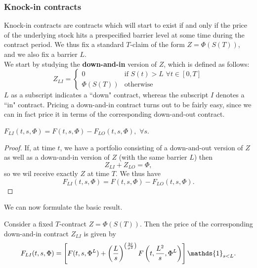 \subsubsection{Knock-in contracts}
Knock-in contracts are contracts which will start to exist if and only if the price of the underlying stock hits a prespecified barrier level at some time during the contract period. We thus fix a standard $T$-claim of the form $Z = \Phi(S(T))$, and we also fix a barrier $L$. \\
We start by studying the \textbf{down-and-in} version of $Z$, which is defined as follows:
\begin{equation}
    Z_{LI} =
    \begin{cases}
        0 & \text{if } S(t)>L\,\,\forall t\in[0,T] \\
        \Phi(S(T)) & \text{otherwise}
    \end{cases}
\end{equation}
$L$ as a subscript indicates a ``down" contract, whereas the subscript $I$ denotes a ``in" contract. Pricing a down-and-in contract turns out to be fairly easy, since we can in fact price it in terms of the corresponding down-and-out contract.
\begin{lemma}
    $F_{LI}(t, s, \Phi) = F(t, s, \Phi) - F_{LO}(t, s, \Phi),\,\, \forall s$.
\end{lemma}
\begin{proof}
    If, at time $t$, we have a portfolio consisting of a down-and-out version of $Z$ as well as a down-and-in version of $Z$ (with the same barrier $L$) then
    \begin{equation*}
        Z_{LI} + Z_{LO} = \Phi,
    \end{equation*}
    so we wil receive exactly $Z$ at time $T$. We thus have
    \begin{equation*}
        F_{LI} (t, s, \Phi) = F(t, s, \Phi) - F_{LO}(t, s, \Phi).
    \end{equation*}
\end{proof}
We can now formulate the basic result.
\begin{proposition}
    Consider a fixed $T$-contract $Z = \Phi(S(T))$. Then the price of the corresponding down-and-in contract $Z_{LI}$ is given by
    \begin{equation}
        F_{LI}(t,s,\Phi) = \left[F(t,s,\Phi^L)+\left(\frac{L}{s}\right)^{\left(\frac{2\Tilde{r}}{\sigma^2}\right)} F\left(t,\frac{L^2}{s},\Phi^L\right)\right]\mathds{1}_{s<L}.
    \end{equation}
\end{proposition}
